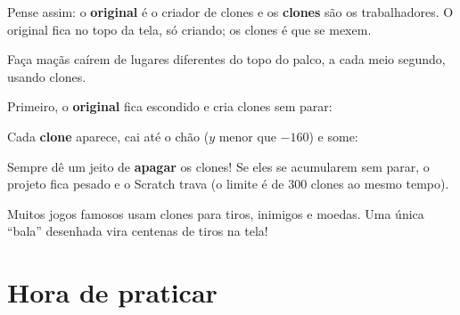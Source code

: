 \begin{dica}
Pense assim: o \textbf{original} é o criador de clones e os \textbf{clones} são os trabalhadores. O original fica no topo da tela, só criando; os clones é que se mexem.
\end{dica}

\begin{missao}
Faça maçãs caírem de lugares diferentes do topo do palco, a cada meio segundo, usando clones.
\end{missao}

Primeiro, o \textbf{original} fica escondido e cria clones sem parar:

\begin{codigo}
\begin{pilha}
\sbcend
\end{pilha}
\end{codigo}

Cada \textbf{clone} aparece, cai até o chão ($y$ menor que $-160$) e some:

\begin{codigo}
\begin{pilha}
\sbcend
{}
\end{pilha}
\end{codigo}

\begin{cuidado}
Sempre dê um jeito de \textbf{apagar} os clones! Se eles se acumularem sem parar, o projeto fica pesado e o Scratch trava (o limite é de 300 clones ao mesmo tempo).
\end{cuidado}

\begin{curiosidade}
Muitos jogos famosos usam clones para tiros, inimigos e moedas. Uma única ``bala'' desenhada vira centenas de tiros na tela!
\end{curiosidade}

\section{Hora de praticar}

